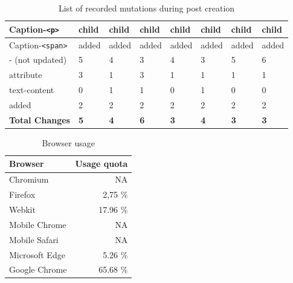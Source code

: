 \documentclass[a4paper, 10pt]{article}
\begin{document}
\begin{table}[!ht]
\begin{adjustbox}{angle=90}
\begin{tabular}{|l|l|l|l|l|l|l|l|}
      Caption-\verb|<p>|              & child               & child         & child               & child         & child           & child           & child           \\ \hline
      Caption-\verb|<span>|           & added               & added         & added               & added         & added           & added           & added           \\ \hline
      \hline
      - (not updated)                 & 5                   & 4             & 3                   & 4             & 3               & 5               & 6               \\ \hline
      \hline
      attribute                       & 3                   & 1             & 3                   & 1             & 1               & 1               & 1               \\ \hline
      text-content                    & 0                   & 1             & 1                   & 0             & 1               & 0               & 0               \\ \hline
      added                           & 2                   & 2             & 2                   & 2             & 2               & 2               & 2               \\ \hline
      \hline
      \textbf{Total Changes}          & \textbf{5}        & \textbf{4}      & \textbf{6}          & \textbf{3}    & \textbf{4}      & \textbf{3}      & \textbf{3}      \\ \hline
    \end{tabular}
  \end{adjustbox}
  \caption{List of recorded mutations during post creation}
  \label{tab:mutations:postCreation}
\end{table}

\begin{table}[!ht]
  \centering
    \begin{tabular}{|l|r|}
      \hline
      \textbf{Browser}  & \textbf{Usage quota} \\ \hline
      Chromium          & NA \\ \hline
      Firefox           & 2,75 \% \\ \hline
      Webkit            & 17.96 \% \\ \hline
      Mobile Chrome     & NA \\ \hline
      Mobile Safari     & NA \\ \hline
      Microsoft Edge    & 5.26 \% \\ \hline
      Google Chrome     & 65.68 \% \\ \hline
    \end{tabular}
  \caption{Browser usage}
  \label{tab:browserUsage}
\end{table}
\end{document}
